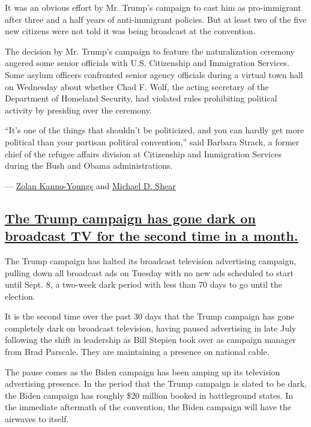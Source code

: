 It was an obvious effort by Mr. Trump's campaign to cast him as
pro-immigrant after three and a half years of anti-immigrant policies.
But at least two of the five new citizens were not told it was being
broadcast at the convention.

The decision by Mr. Trump's campaign to feature the naturalization
ceremony angered some senior officials with U.S. Citizenship and
Immigration Services. Some asylum officers confronted senior agency
officials during a virtual town hall on Wednesday about whether Chad F.
Wolf, the acting secretary of the Department of Homeland Security, had
violated rules prohibiting political activity by presiding over the
ceremony.

``It's one of the things that shouldn't be politicized, and you can
hardly get more political than your partisan political convention,''
said Barbara Strack, a former chief of the refugee affairs division at
Citizenship and Immigration Services during the Bush and Obama
administrations.

---
\href{https://www.nytimes3xbfgragh.onion/by/zolan-kanno-youngs}{Zolan
Kanno-Youngs} and
\href{https://www.nytimes3xbfgragh.onion/by/michael-d-shear}{Michael D.
Shear}

\hypertarget{the-trump-campaign-has-gone-dark-on-broadcast-tv-for-the-second-time-in-a-month}{%
\subsection{\texorpdfstring{\protect\hyperlink{the-trump-campaign-has-gone-dark-on-broadcast-tv-for-the-second-time-in-a-month}{The
Trump campaign has gone dark on broadcast TV for the second time in a
month.}}{The Trump campaign has gone dark on broadcast TV for the second time in a month.}}\label{the-trump-campaign-has-gone-dark-on-broadcast-tv-for-the-second-time-in-a-month}}

The Trump campaign has halted its broadcast television advertising
campaign, pulling down all broadcast ads on Tuesday with no new ads
scheduled to start until Sept. 8, a two-week dark period with less than
70 days to go until the election.

It is the second time over the past 30 days that the Trump campaign has
gone completely dark on broadcast television, having paused advertising
in late July following the shift in leadership as Bill Stepien took over
as campaign manager from Brad Parscale. They are maintaining a presence
on national cable.

The pause comes as the Biden campaign has been amping up its television
advertising presence. In the period that the Trump campaign is slated to
be dark, the Biden campaign has roughly \$20 million booked in
battleground states. In the immediate aftermath of the convention, the
Biden campaign will have the airwaves to itself.

